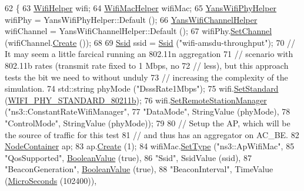 \begin{DoxyCode}
62 \{
63   \hyperlink{classns3_1_1WifiHelper}{WifiHelper} wifi;
64   \hyperlink{classns3_1_1WifiMacHelper}{WifiMacHelper} wifiMac;
65   \hyperlink{classns3_1_1YansWifiPhyHelper}{YansWifiPhyHelper} wifiPhy = YansWifiPhyHelper::Default ();
66   \hyperlink{classns3_1_1YansWifiChannelHelper}{YansWifiChannelHelper} wifiChannel = YansWifiChannelHelper::Default ();
67   wifiPhy.\hyperlink{classns3_1_1YansWifiPhyHelper_ad2e9a27587dd4ff320435c93cc2676de}{SetChannel} (wifiChannel.\hyperlink{classns3_1_1YansWifiChannelHelper_a0532e292ab9452f3cf630c848708e563}{Create} ());
68 
69   \hyperlink{classns3_1_1Ssid}{Ssid} ssid = \hyperlink{classns3_1_1Ssid}{Ssid} (\textcolor{stringliteral}{"wifi-amsdu-throughput"});
70   \textcolor{comment}{// It may seem a little farcical running an 802.11n aggregation}
71   \textcolor{comment}{// scenario with 802.11b rates (transmit rate fixed to 1 Mbps, no}
72   \textcolor{comment}{// less), but this approach tests the bit we need to without unduly}
73   \textcolor{comment}{// increasing the complexity of the simulation.}
74   std::string phyMode (\textcolor{stringliteral}{"DsssRate1Mbps"});
75   wifi.\hyperlink{classns3_1_1WifiHelper_aa54f3e61527ef8de318d310045bc5dfd}{SetStandard} (\hyperlink{group__wifi_gga1299834f4e1c615af3ca738033b76a49a77e1cc9f77a0bce8e2bc82cbef437b5a}{WIFI\_PHY\_STANDARD\_80211b});
76   wifi.\hyperlink{classns3_1_1WifiHelper_a3d01b178aeb2de246ab5a3aa5638ce24}{SetRemoteStationManager} (\textcolor{stringliteral}{"ns3::ConstantRateWifiManager"},
77                                 \textcolor{stringliteral}{"DataMode"}, StringValue (phyMode),
78                                 \textcolor{stringliteral}{"ControlMode"}, StringValue (phyMode));
79 
80   \textcolor{comment}{// Setup the AP, which will be the source of traffic for this test}
81   \textcolor{comment}{// and thus has an aggregator on AC\_BE.}
82   \hyperlink{classns3_1_1NodeContainer}{NodeContainer} ap;
83   ap.\hyperlink{classns3_1_1NodeContainer_a787f059e2813e8b951cc6914d11dfe69}{Create} (1);
84   wifiMac.\hyperlink{classns3_1_1WifiMacHelper_a382d8df76a1dd7007179d1963b4b6bc6}{SetType} (\textcolor{stringliteral}{"ns3::ApWifiMac"},
85                    \textcolor{stringliteral}{"QosSupported"}, \hyperlink{classns3_1_1BooleanValue}{BooleanValue} (\textcolor{keyword}{true}),
86                    \textcolor{stringliteral}{"Ssid"}, SsidValue (ssid),
87                    \textcolor{stringliteral}{"BeaconGeneration"}, \hyperlink{classns3_1_1BooleanValue}{BooleanValue} (\textcolor{keyword}{true}),
88                    \textcolor{stringliteral}{"BeaconInterval"}, TimeValue (\hyperlink{group__timecivil_ga17465a639c8d1464e76538afdd78a9f0}{MicroSeconds} (102400)),

\end{DoxyCode}
